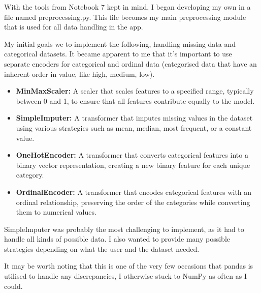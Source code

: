 \documentclass[letterpaper,10pt]{article}
\begin{document}
With the tools from Notebook 7 kept in mind, I began developing my own in a file named preprocessing.py. This file becomes my main preprocessing module that is used for all data handling in the app. \par

My initial goals we to implement the following, handling missing data and categorical datasets. It became apparent to me that it's important to use separate encoders for categorical and ordinal data (categorised data that have an inherent order in value, like high, medium, low). \par 
\begin{itemize}
\item \textbf{MinMaxScaler:} A scaler that scales features to a specified range, typically between 0 and 1, to ensure that all features contribute equally to the model.

\item \textbf{SimpleImputer:} A transformer that imputes missing values in the dataset using various strategies such as mean, median, most frequent, or a constant value.

\item \textbf{OneHotEncoder:} A transformer that converts categorical features into a binary vector representation, creating a new binary feature for each unique category.

\item \textbf{OrdinalEncoder:} A transformer that encodes categorical features with an ordinal relationship, preserving the order of the categories while converting them to numerical values.


\end{itemize}

SimpleImputer was probably the most challenging to implement, as it had to handle all kinds of possible data. I also wanted to provide many possible strategies depending on what the user and the dataset needed. \par
It may be worth noting that this is one of the very few occasions that pandas is utilised to handle any discrepancies, I otherwise stuck to NumPy as often as I could. \par
\end{document}
